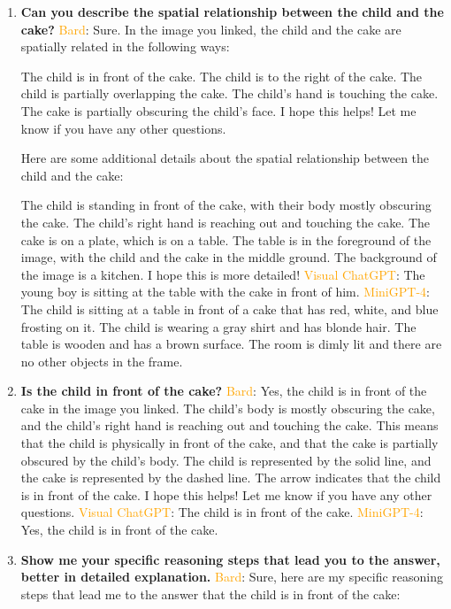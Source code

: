     \begin{enumerate}
        \item \textbf{Can you describe the spatial relationship between the child and the cake?}
        \subitem \textcolor{orange}{Bard}: 
        Sure. In the image you linked, the child and the cake are spatially related in the following ways:
        
        The child is in front of the cake.
        The child is to the right of the cake.
        The child is partially overlapping the cake.
        The child's hand is touching the cake.
        The cake is partially obscuring the child's face.
        I hope this helps! Let me know if you have any other questions.
        
        Here are some additional details about the spatial relationship between the child and the cake:
        
        The child is standing in front of the cake, with their body mostly obscuring the cake.
        The child's right hand is reaching out and touching the cake.
        The cake is on a plate, which is on a table.
        The table is in the foreground of the image, with the child and the cake in the middle ground.
        The background of the image is a kitchen.
        I hope this is more detailed!
        \subitem \textcolor{orange}{Visual ChatGPT}: The young boy is sitting at the table with the cake in front of him.
        \subitem \textcolor{orange}{MiniGPT-4}: The child is sitting at a table in front of a cake that has red, white, and blue frosting on it. The child is wearing a gray shirt and has blonde hair. The table is wooden and has a brown surface. The room is dimly lit and there are no other objects in the frame.
        \item \textbf{Is the child in front of the cake?}
        \subitem \textcolor{orange}{Bard}: 
        Yes, the child is in front of the cake in the image you linked. The child's body is mostly obscuring the cake, and the child's right hand is reaching out and touching the cake. This means that the child is physically in front of the cake, and that the cake is partially obscured by the child's body.
        The child is represented by the solid line, and the cake is represented by the dashed line. The arrow indicates that the child is in front of the cake.
        I hope this helps! Let me know if you have any other questions.
        \subitem \textcolor{orange}{Visual ChatGPT}: The child is in front of the cake.
        \subitem \textcolor{orange}{MiniGPT-4}: Yes, the child is in front of the cake.
        \item \textbf{Show me your specific reasoning steps that lead you to the answer, better in detailed explanation.}
        \subitem \textcolor{orange}{Bard}:
        Sure, here are my specific reasoning steps that lead me to the answer that the child is in front of the cake:


\end{enumerate}
